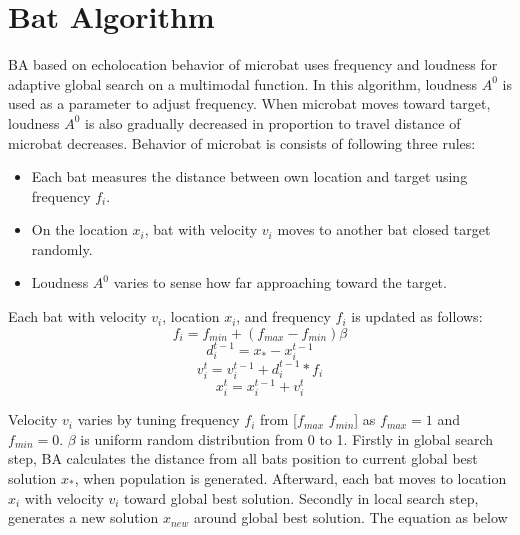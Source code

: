 \section{Bat Algorithm}
BA based on echolocation behavior of microbat uses frequency and loudness for adaptive global search on a multimodal function. In this algorithm, loudness ${A^0}$ is used as a parameter to adjust frequency. When microbat moves toward target, loudness ${A^0}$ is also gradually decreased in proportion to travel distance of microbat decreases. Behavior of microbat is consists of following three rules: 

\begin{itemize}
\item Each bat measures the distance between own location and target using frequency ${f_i}$.
\item On the location ${x_i}$, bat with velocity ${v_i}$ moves to another bat closed target randomly.
\item Loudness ${A^0}$ varies to sense how far approaching toward the target.  
\end{itemize}

Each bat with velocity ${v_i}$, location ${x_i}$, and frequency ${f_i}$ is updated as follows:
\begin{equation}
f_{i} =f_{min}+(f_{max}-f_{min}) \beta
\label{eq:freq} 
\end{equation}
\begin{equation}
d_i^{t-1}=x_*-x_i^{t-1}
\label{eq:d}
\end{equation}
\begin{equation}
v_i^t=v_i^{t-1}+d_i^{t-1}* f_i
\label{eq:vel}
\end{equation}
\begin{equation}
x_i^t=x_i^{t-1}+v_i^t
\label{eq:xi}
\end{equation}

Velocity ${v_i}$ varies by tuning frequency ${f_i}$ from [${f_{max}}$ ${f_{min}}$] as ${f_{max}}=1$ and ${f_{min}}=0$. $\beta $ is uniform random distribution from 0 to 1. Firstly in global search step, BA calculates the distance from all bats position to current global best solution ${x_*}$, when population is generated. Afterward, each bat moves to location ${x_i}$ with velocity ${v_i}$ toward global best solution.
 Secondly in local search step, generates a new solution ${x_{new}}$ around global best solution.
  The equation as below

